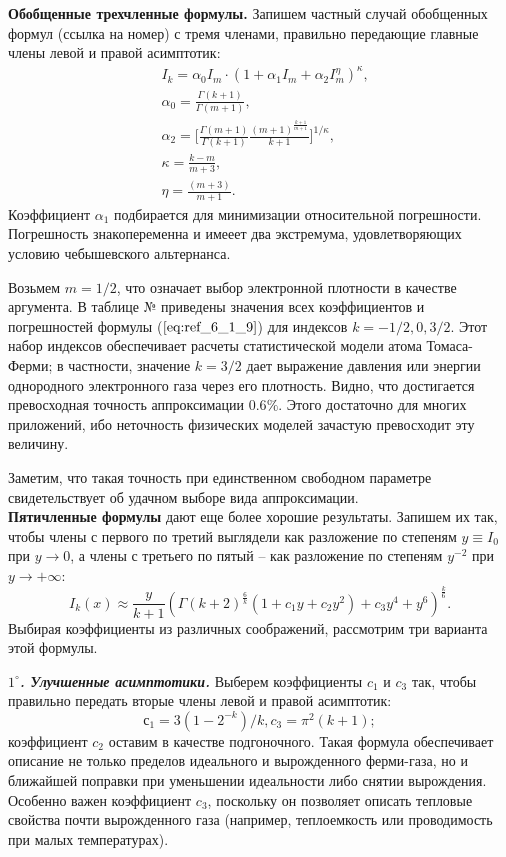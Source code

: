 \textbf{Обобщенные трехчленные формулы.} Запишем частный случай обобщенных формул (ссылка на номер) с тремя членами, правильно передающие главные члены левой и правой асимптотик:
\begin{equation}
\begin{aligned}
&I_k = \alpha_0 I_m \cdot (1 + \alpha_1 I_m + \alpha_2 I_m^{\eta})^\kappa,\\
&\alpha_0 = \frac{\Gamma(k+1)}{\Gamma(m+1)},\\
&\alpha_2 = \Bigg[\frac{\Gamma(m+1)}{\Gamma(k+1)} \frac{(m+1)^{\frac{k+1}{m+1}}}{k+1}\Bigg]^{1/{\kappa}}, \\
&\kappa = \frac{k - m}{m + 3}, \\
&\eta = \frac{(m+3)}{m+1}.
\end{aligned}
\label{eq:ref_6_1_9}
\end{equation}
Коэффициент $\alpha_1$ подбирается для минимизации относительной погрешности. Погрешность знакопеременна и имееет два экстремума, удовлетворяющих условию чебышевского альтернанса.

Возьмем $m=1/2$, что означает выбор электронной плотности в качестве аргумента. В таблице № приведены значения всех коэффициентов и погрешностей формулы ($\ref{eq:ref_6_1_9}$) для индексов $k = -1/2, 0, 3/2$. Этот набор индексов обеспечивает расчеты статистической модели атома Томаса-Ферми; в частности, значение $k=3/2$ дает выражение давления или энергии однородного электронного газа через его плотность. Видно, что достигается превосходная точность аппроксимации $0.6\%$. Этого достаточно для многих приложений, ибо неточность физических моделей зачастую превосходит эту величину.

Заметим, что такая точность при единственном свободном параметре свидетельствует об удачном выборе вида аппроксимации.
\\

\textbf{Пятичленные формулы} дают еще более хорошие результаты. Запишем их так, чтобы
члены с первого по третий выглядели как разложение по степеням $y \equiv I_0$ при $y \to 0$, а
члены с третьего по пятый – как разложение по степеням $y^{-2}$ при $y \to +\infty$:
\begin{equation}
I_k(x) \approx \frac{y}{k+1}(\Gamma(k+2)^{\frac{6}{k}}(1 + c_1y + c_2y^2) + c_3y^4 + y^6)^{\frac{k}{6}}.
\label{eq:ref_6_1_10}
\end{equation}
Выбирая коэффициенты из различных соображений, рассмотрим три варианта этой
формулы.

\textbf{\textit{$1^{\circ}$. Улучшенные асимптотики.}} Выберем коэффициенты $c_1$ и $c_3$ так, чтобы правильно передать вторые члены левой и правой асимптотик:
\begin{equation}
с_1 = 3 (1-2^{-k})/k,
c_3 = \pi^2 (k + 1);
\label{eq:ref_6_1_11}
\end{equation}
коэффициент $c_2$ оставим в качестве подгоночного. Такая формула обеспечивает описание
 не только пределов идеального и вырожденного ферми-газа, но и ближайшей поправки при
уменьшении идеальности либо снятии вырождения. Особенно важен коэффициент $c_3$, поскольку он позволяет описать тепловые свойства почти вырожденного газа (например, теплоемкость или проводимость при малых температурах).

